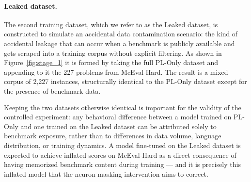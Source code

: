 \documentclass[mscthesis]{usiinfthesis}
\begin{document}
\paragraph{Leaked dataset.}
The second training dataset, which we refer to as the Leaked dataset, is constructed
to simulate an accidental data contamination scenario: the kind of accidental leakage that
can occur when a benchmark is publicly available and gets scraped into a training corpus
without explicit filtering. As shown in Figure~\ref{fig:stage_1} it is formed by taking the full PL-Only dataset and appending to it
the 227 problems from McEval-Hard. The result is a mixed corpus of 2,227 instances, structurally identical to
the PL-Only dataset except for the presence of benchmark data.
\par\vspace{1em} 
Keeping the two datasets otherwise identical is important for the validity of the controlled
experiment: any behavioral difference between a model trained on PL-Only and one trained
on the Leaked dataset can be attributed solely to benchmark exposure, rather than to
differences in data volume, language distribution, or training dynamics. A model fine-tuned
on the Leaked dataset is expected to achieve inflated scores on McEval-Hard as a direct
consequence of having memorized benchmark content during training --- and it is precisely
this inflated model that the neuron masking intervention aims to correct.
\end{document}
